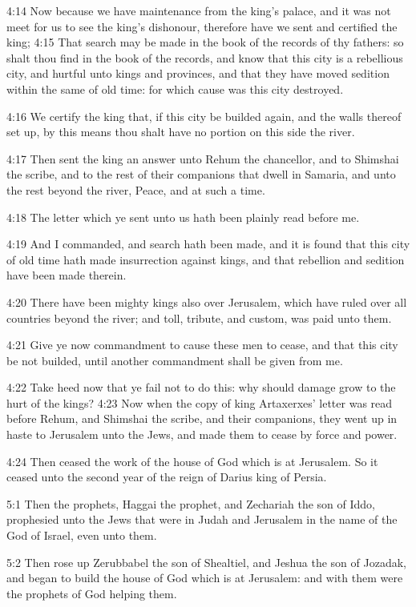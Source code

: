 4:14 Now because we have maintenance from the king's palace, and it was not meet for us to see the king's dishonour, therefore have we sent and certified the king; 4:15 That search may be made in the book of the records of thy fathers: so shalt thou find in the book of the records, and know that this city is a rebellious city, and hurtful unto kings and provinces, and that they have moved sedition within the same of old time: for which cause was this city destroyed.

4:16 We certify the king that, if this city be builded again, and the walls thereof set up, by this means thou shalt have no portion on this side the river.

4:17 Then sent the king an answer unto Rehum the chancellor, and to Shimshai the scribe, and to the rest of their companions that dwell in Samaria, and unto the rest beyond the river, Peace, and at such a time.

4:18 The letter which ye sent unto us hath been plainly read before me.

4:19 And I commanded, and search hath been made, and it is found that this city of old time hath made insurrection against kings, and that rebellion and sedition have been made therein.

4:20 There have been mighty kings also over Jerusalem, which have ruled over all countries beyond the river; and toll, tribute, and custom, was paid unto them.

4:21 Give ye now commandment to cause these men to cease, and that this city be not builded, until another commandment shall be given from me.

4:22 Take heed now that ye fail not to do this: why should damage grow to the hurt of the kings?  4:23 Now when the copy of king Artaxerxes' letter was read before Rehum, and Shimshai the scribe, and their companions, they went up in haste to Jerusalem unto the Jews, and made them to cease by force and power.

4:24 Then ceased the work of the house of God which is at Jerusalem.  So it ceased unto the second year of the reign of Darius king of Persia.

5:1 Then the prophets, Haggai the prophet, and Zechariah the son of Iddo, prophesied unto the Jews that were in Judah and Jerusalem in the name of the God of Israel, even unto them.

5:2 Then rose up Zerubbabel the son of Shealtiel, and Jeshua the son of Jozadak, and began to build the house of God which is at Jerusalem: and with them were the prophets of God helping them.

